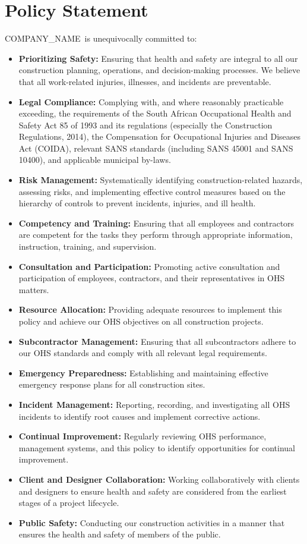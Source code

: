 \documentclass[11pt]{article}
\newcommand{\clientName}{{{COMPANY_NAME}}}
\begin{document}
\section{Policy Statement}
\clientName\ is unequivocally committed to:
\begin{itemize}
    \item \textbf{Prioritizing Safety:} Ensuring that health and safety are integral to all our construction planning, operations, and decision-making processes. We believe that all work-related injuries, illnesses, and incidents are preventable.
    \item \textbf{Legal Compliance:} Complying with, and where reasonably practicable exceeding, the requirements of the South African Occupational Health and Safety Act 85 of 1993 and its regulations (especially the Construction Regulations, 2014), the Compensation for Occupational Injuries and Diseases Act (COIDA), relevant SANS standards (including SANS 45001 and SANS 10400), and applicable municipal by-laws.
    \item \textbf{Risk Management:} Systematically identifying construction-related hazards, assessing risks, and implementing effective control measures based on the hierarchy of controls to prevent incidents, injuries, and ill health.
    \item \textbf{Competency and Training:} Ensuring that all employees and contractors are competent for the tasks they perform through appropriate information, instruction, training, and supervision.
    \item \textbf{Consultation and Participation:} Promoting active consultation and participation of employees, contractors, and their representatives in OHS matters.
    \item \textbf{Resource Allocation:} Providing adequate resources to implement this policy and achieve our OHS objectives on all construction projects.
    \item \textbf{Subcontractor Management:} Ensuring that all subcontractors adhere to our OHS standards and comply with all relevant legal requirements.
    \item \textbf{Emergency Preparedness:} Establishing and maintaining effective emergency response plans for all construction sites.
    \item \textbf{Incident Management:} Reporting, recording, and investigating all OHS incidents to identify root causes and implement corrective actions.
    \item \textbf{Continual Improvement:} Regularly reviewing OHS performance, management systems, and this policy to identify opportunities for continual improvement.
    \item \textbf{Client and Designer Collaboration:} Working collaboratively with clients and designers to ensure health and safety are considered from the earliest stages of a project lifecycle.
    \item \textbf{Public Safety:} Conducting our construction activities in a manner that ensures the health and safety of members of the public.
\end{itemize}
\end{document}
